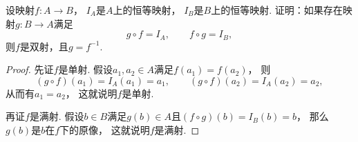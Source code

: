 \begin{example}\label{example:映射.可逆映射是双射}
设映射\(f\colon A \to B\)，
\(I_A\)是\(A\)上的恒等映射，
\(I_B\)是\(B\)上的恒等映射.
证明：如果存在映射\(g\colon B \to A\)满足\begin{equation*}
	g \circ f = I_A,
	\qquad
	f \circ g = I_B,
\end{equation*}
则\(f\)是双射，且\(g = f^{-1}\).
\begin{proof}
先证\(f\)是单射.
假设\(a_1,a_2 \in A\)满足\(f(a_1) = f(a_2)\)，
则\begin{equation*}
	(g \circ f)(a_1)
	= I_A(a_1)
	= a_1,
	\qquad
	(g \circ f)(a_2)
	= I_A(a_2)
	= a_2,
\end{equation*}
从而有\(a_1 = a_2\)，
这就说明\(f\)是单射.

再证\(f\)是满射.
假设\(b \in B\)满足\(g(b) \in A\)且\((f \circ g)(b) = I_B(b) = b\)，
那么\(g(b)\)是\(b\)在\(f\)下的原像，
这就说明\(f\)是满射.
\end{proof}
\end{example}

